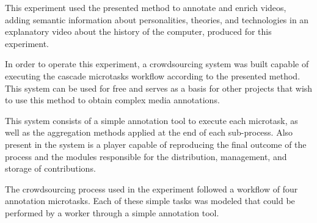 This experiment used the presented method to annotate and enrich videos, adding semantic information about personalities, theories, and technologies in an explanatory video about the history of the computer, produced for this experiment.


In order to operate this experiment, a crowdsourcing system was built capable of executing the cascade microtasks workflow according to the presented method. This system can be used for free and serves as a basis for other projects that wish to use this method to obtain complex media annotations.

This system consists of a simple annotation tool to execute each microtask, as well as the aggregation methods applied at the end of each sub-process. Also present in the system is a player capable of reproducing the final outcome of the process and the modules responsible for the distribution, management, and storage of contributions.



The crowdsourcing process used in the experiment followed a workflow of four annotation microtasks. Each of these simple tasks was modeled that could be performed by a worker through a simple annotation tool. 


